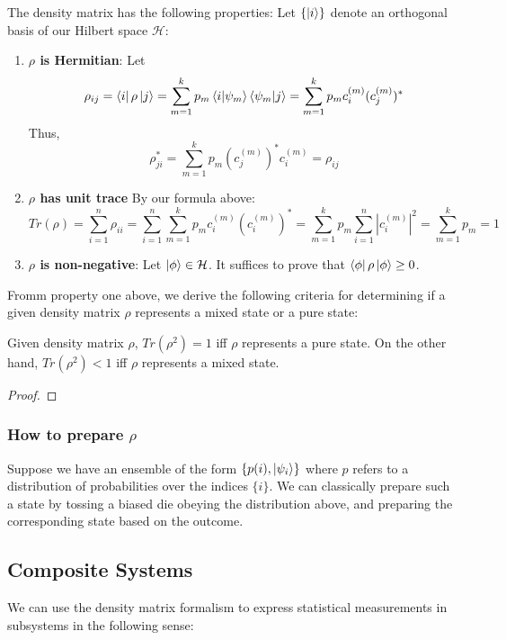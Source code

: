 \documentclass{../quantum.tex}
\begin{document}
The density matrix has the following properties: Let $\{\ket{i}\}$ denote an orthogonal basis of our Hilbert space $\mathcal{H}$:

\begin{enumerate}
  \item {\bf $\rho$ is Hermitian}: Let
  $$ \rho_{ij} = \bra{i}\rho\ket{j} = \sum_{m=1}^k p_m \bra{i}\ket{\psi_m} \bra{\psi_m}\ket{j} = \sum_{m=1}^k p_m c_i^{(m)} (c_j^{(m)})^*$$ Thus,
  $$ \rho_{ji}^* = \sum_{m=1}^k p_m (c_j^{(m)})^* c_i^{(m)} = \rho_{ij}  $$
  \item {\bf $\rho$ has unit trace} By our formula above:
  $$ Tr(\rho) = \sum_{i=1}^n \rho_{ii} = \sum_{i=1}^n\sum_{m=1}^k p_m c_{i}^{(m)}(c_{i}^{(m)})^* = \sum_{m=1}^k p_m \sum_{i=1}^n|c_i^{(m)}|^2 =
  \sum_{m=1}^k p_m = 1
  $$
  \item {\bf $\rho$ is non-negative}: Let $\ket{\phi} \in \mathcal{H}$. It suffices to prove that $\bra{\phi}\rho\ket{\phi} \geq 0$.
\end{enumerate}

Fromm property one above, we derive the following criteria for determining if a given density matrix $\rho$ represents a mixed state or a pure state:

\begin{theorem}
  Given density matrix $\rho$, $Tr(\rho^2) = 1$ iff $\rho$ represents a pure state. On the other hand, $Tr(\rho^2) < 1$ iff $\rho$ represents a mixed state.
\end{theorem}

\begin{proof}

\end{proof}

\subsubsection{How to prepare $\rho$}
Suppose we have an ensemble of the form $\{p(i),\ket{\psi_i}\}$ where $p$ refers to a distribution of probabilities over the indices $\{i\}$. We can classically prepare such a state by tossing a biased die obeying the distribution above, and preparing the corresponding state based on the outcome.

\subsection{Composite Systems}

We can use the density matrix formalism to express statistical measurements in subsystems in the following sense:
\end{document}
